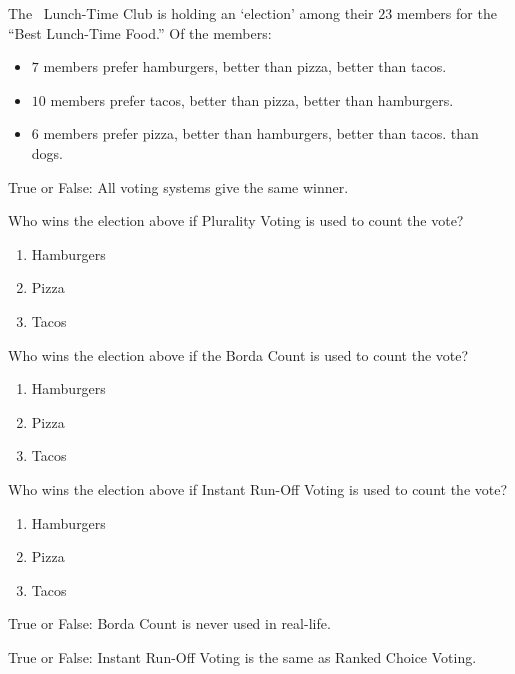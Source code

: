 \documentclass[nooutcomes,noauthor]{ximera}
\author{Bart Snapp}
\begin{document}
\maketitle

The \mooculus~Lunch-Time Club is holding an `election' among their
$23$ members for the ``Best Lunch-Time Food.'' Of the members:
\begin{itemize}
\item $7$ members prefer hamburgers, better than pizza, better than tacos. 
\item $10$ members prefer tacos, better than pizza, better than hamburgers. 
\item $6$ members prefer pizza, better than hamburgers, better than tacos.
  than dogs.
\end{itemize}

\begin{exercise}
  True or False: All voting systems give the same winner.
 
\end{exercise}


\begin{exercise}
  Who wins the election above if Plurality Voting is used to count the
  vote?
  \begin{multicols}{3}
  \begin{enumerate}
  \item Hamburgers
  \item Pizza
  \item Tacos
  \end{enumerate}
  \end{multicols}
\end{exercise}



\begin{exercise}
  Who wins the election above if the Borda Count is used to count the
  vote?
  \begin{multicols}{3}
  \begin{enumerate}
  \item Hamburgers
  \item Pizza
  \item Tacos
  \end{enumerate}
  \end{multicols}
\end{exercise}



\begin{exercise}
  Who wins the election above if Instant Run-Off Voting is used to
  count the vote?
  \begin{multicols}{3}
  \begin{enumerate}
  \item Hamburgers
  \item Pizza
  \item Tacos
  \end{enumerate}
  \end{multicols}
\end{exercise}



\begin{exercise}
  True or False: Borda Count is never used in real-life.
\end{exercise}



\begin{exercise}
  True or False: Instant Run-Off Voting is the same as Ranked Choice Voting.
\end{exercise}


\end{document}

